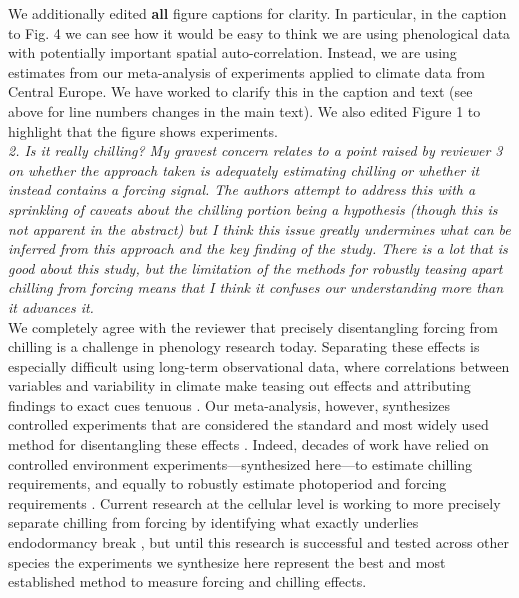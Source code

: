 \documentclass{article}
\begin{document}
We additionally edited {\bf all} figure captions for clarity. In particular, in the caption to Fig. 4 we can see how it would be easy to think we are using phenological data with potentially important spatial auto-correlation. Instead, we are using estimates from our meta-analysis of experiments applied to climate data from Central Europe. We have worked to clarify this in the caption and text (see above for line numbers changes in the main text). We also edited Figure 1 to highlight that the figure shows experiments. \\

\emph{2. Is it really chilling? My gravest concern relates to a point raised by reviewer 3 on whether the
approach taken is adequately estimating chilling or whether it instead contains a forcing signal.
The authors attempt to address this with a sprinkling of caveats about the chilling portion
being a hypothesis (though this is not apparent in the abstract) but I think this issue greatly
undermines what can be inferred from this approach and the key finding of the study. There is
a lot that is good about this study, but the limitation of the methods for robustly teasing apart
chilling from forcing means that I think it confuses our understanding more than it advances it.}\\

We completely agree with the reviewer that precisely disentangling forcing from chilling is a challenge in phenology research today. Separating these effects is especially difficult using long-term observational data, where correlations between variables and variability in climate make teasing out effects and attributing findings to exact cues tenuous \citep[e.g.,][]{fu2015}. Our meta-analysis, however, synthesizes controlled experiments that are considered the standard and most widely used method for disentangling these effects \citep{samish1954,frostbook,chuinearees}. Indeed, decades of work have relied on controlled environment experiments---synthesized here---to estimate chilling requirements, and equally to robustly estimate photoperiod and forcing requirements \citep[e.g.][]{Junttila:2012aa, Worrall:1967aa}. Current research at the cellular level is working to more precisely separate chilling from forcing by identifying what exactly underlies endodormancy break \citep[e.g., work on the compound callous, see][]{rinne2011,vanderschoot2014}, but until this research is successful and tested across other species the experiments we synthesize here represent the best and most established method to measure forcing and chilling effects. \\
\end{document}
